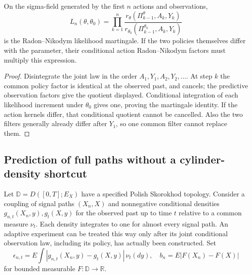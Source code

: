 \begin{proposition}
\label{prop:r33-c2-likelihood}
On the sigma-field generated by the first $n$ actions and observations,
\[
 L_n(\theta,\theta_0)=
 \prod_{k=1}^n
 \frac{r_\theta(\Pi_{k-1}^\theta,A_k,Y_k)}
      {r_{\theta_0}(\Pi_{k-1}^{\theta_0},A_k,Y_k)}
\]
is the Radon--Nikodym likelihood martingale. If the two policies themselves differ with the parameter, their conditional action Radon--Nikodym factors must multiply this expression.
\end{proposition}
\begin{proof}
Disintegrate the joint law in the order $A_1,Y_1,A_2,Y_2,\ldots$. At step $k$ the common policy factor is identical at the observed past, and cancels; the predictive observation factors give the quotient displayed. Conditional integration of each likelihood increment under $\theta_0$ gives one, proving the martingale identity. If the action kernels differ, that conditional quotient cannot be cancelled. Also the two filters generally already differ after $Y_1$, so one common filter cannot replace them.
\end{proof}

\subsection{Prediction of full paths without a cylinder-density shortcut}
Let $\mathbb D=D([0,T];E_X)$ have a specified Polish Skorokhod topology. Consider a coupling of signal paths $(X_n,X)$ and nonnegative conditional densities $g_{n,t}(X_n,y),g_t(X,y)$ for the observed past up to time $t$ relative to a common measure $\nu_t$. Each density integrates to one for almost every signal path. An adaptive experiment can be treated this way only after its joint conditional observation law, including its policy, has actually been constructed. Set
\[
 \epsilon_{n,t}=E\int|g_{n,t}(X_n,y)-g_t(X,y)|\,\nu_t(dy),
 \quad b_n=E|F(X_n)-F(X)|
\]
for bounded measurable $F:\mathbb D\to\mathbb R$.

